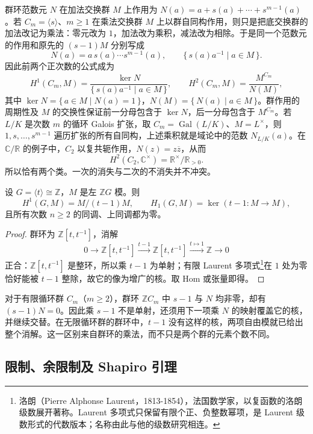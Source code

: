 \ProseParagraphBreak
群环范数元 \(N\) 在加法交换群 \(M\) 上作用为 \(N(a)=a+s(a)+\cdots+s^{m-1}(a)\)。若 \(C_m=\langle s\rangle\)、\(m\ge1\) 在乘法交换群 \(M\) 上以群自同构作用，则只是把底交换群的加法改记为乘法：零元改为 \(1\)，加法改为乘积，减法改为相除。于是同一个范数元的作用和原先的 \((s-1)M\) 分别写成
\[
	N(a)=a\,s(a)\cdots s^{m-1}(a),\qquad \{\,s(a)a^{-1}\mid a\in M\,\}.
\]
因此前两个正次数的公式成为
\[
	H^1(C_m,M)=\dfrac{\ker N}{\{\,s(a)a^{-1}\mid a\in M\,\}}, \qquad H^2(C_m,M)=\dfrac{M^{C_m}}{N(M)},
\]
其中 \(\ker N=\{\,a\in M\mid N(a)=1\,\}\)，\(N(M)=\{\,N(a)\mid a\in M\,\}\)。群作用的周期性及 \(M\) 的交换性保证前一分母包含于 \(\ker N\)，后一分母包含于 \(M^{C_m}\)。若 \(L/K\) 是次数 \(m\) 的循环 Galois 扩张，取 \(C_m=\operatorname{Gal}(L/K)\)、\(M=L^\times\)，则 \(1,s,\ldots,s^{m-1}\) 遍历扩张的所有自同构，上述乘积就是域论中的范数 \(N_{L/K}(a)\)。在 \(\mathbb C/\mathbb R\) 的例子中，\(C_2\) 以复共轭作用，\(N(z)=z\overline z\)，从而
\[
	H^2(C_2,\mathbb C^\times)=\mathbb R^\times/\mathbb R_{>0}.
\]
所以恰有两个类。一次的消失与二次的不消失并不冲突。

\begin{proposition}\label{b4:prop:infinite-cyclic-cohomology}
	设 \(G=\langle t\rangle\cong\mathbb Z\)，\(M\) 是左 \(\mathbb ZG\) 模。则
	\[
		H^1(G,M)=M/(t-1)M,\qquad H_1(G,M)=\ker(t-1:M\to M),
	\]
	且所有次数 \(n\ge2\) 的同调、上同调都为零。
\end{proposition}
\begin{proof}
	群环为 \(\mathbb Z[t,t^{-1}]\)，消解
	\[
		0\longrightarrow\mathbb Z[t,t^{-1}] \xrightarrow{t-1}\mathbb Z[t,t^{-1}] \xrightarrow{t\mapsto1}\mathbb Z\longrightarrow0
	\]
	正合：\(\mathbb Z[t,t^{-1}]\) 是整环，所以乘 \(t-1\) 为单射；有限 Laurent 多项式\footnote{洛朗（Pierre Alphonse Laurent，1813-1854），法国数学家，以复函数的洛朗级数展开著称。Laurent 多项式只保留有限个正、负整数幂项，是 Laurent 级数形式的代数版本；名称由此与他的级数研究相连。}在 \(1\) 处为零恰好能被 \(t-1\) 整除，故它的像为增广的核。取 Hom 或张量即得。
\end{proof}

对于有限循环群 \(C_m\)（\(m\ge2\)），群环 \(\mathbb ZC_m\) 中 \(s-1\) 与 \(N\) 均非零，却有 \((s-1)N=0\)。因此乘 \(s-1\) 不是单射，还须用下一项乘 \(N\) 的映射覆盖它的核，并继续交替。在无限循环群的群环中，\(t-1\) 没有这样的核，两项自由模就已给出整个消解。这一区别来自群环的乘法，而不只是两个群的元素个数不同。

\subsection{限制、余限制及 Shapiro 引理}
\label{b4:subsec:1103:02}


